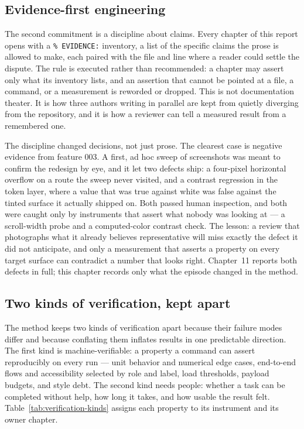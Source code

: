\subsection{Evidence-first engineering}

The second commitment is a discipline about claims. Every chapter of this
report opens with a \texttt{\% EVIDENCE:} inventory, a list of the specific
claims the prose is allowed to make, each paired with the file and line where a
reader could settle the dispute. The rule is executed rather than recommended:
a chapter may assert only what its inventory lists, and an assertion that
cannot be pointed at a file, a command, or a measurement is reworded or dropped.
This is not documentation theater. It is how three authors writing in parallel
are kept from quietly diverging from the repository, and it is how a reviewer
can tell a measured result from a remembered one.

The discipline changed decisions, not just prose. The clearest case is negative
evidence from feature 003. A first, ad hoc sweep of screenshots was meant to
confirm the redesign by eye, and it let two defects ship: a four-pixel
horizontal overflow on a route the sweep never visited, and a contrast
regression in the token layer, where a value that was true against white was
false against the tinted surface it actually shipped on. Both passed human
inspection, and both were caught only by instruments that assert what nobody
was looking at --- a scroll-width probe and a computed-color contrast check.
The lesson: a review that photographs what it already believes representative
will miss exactly the defect it did not anticipate, and only a measurement that
asserts a property on every target surface can contradict a number that looks
right. Chapter~11 reports both defects in full; this chapter records only what
the episode changed in the method.

\subsection{Two kinds of verification, kept apart}

The method keeps two kinds of verification apart because their failure modes
differ and because conflating them inflates results in one predictable
direction. The first kind is machine-verifiable: a property a command can
assert reproducibly on every run --- unit behavior and numerical edge cases,
end-to-end flows and accessibility selected by role and label, load thresholds,
payload budgets, and style debt. The second kind needs people: whether a task
can be completed without help, how long it takes, and how usable the result
felt. Table~\ref{tab:verification-kinds} assigns each property to its
instrument and its owner chapter.

